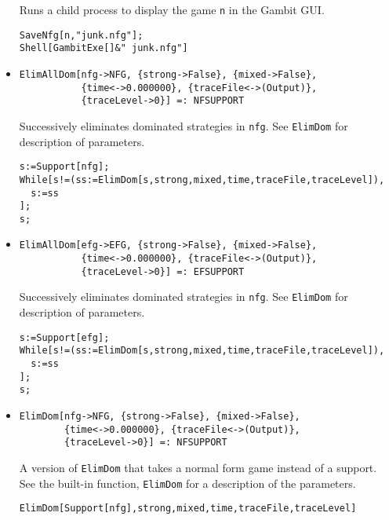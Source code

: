 \begin{itemize}
\bd 
Runs a child process to display the game \verb+n+ in the Gambit GUI. 
\begin{verbatim}
SaveNfg[n,"junk.nfg"];
Shell[GambitExe[]&" junk.nfg"]
\end{verbatim} 
\ed


\item{}
\protect \large \begin{verbatim}
ElimAllDom[nfg->NFG, {strong->False}, {mixed->False}, 
           {time<->0.000000}, {traceFile<->(Output)}, 
           {traceLevel->0}] =: NFSUPPORT 
\end{verbatim}\normalsize

\bd 
Successively eliminates dominated strategies in \verb+nfg+.  See
\verb+ElimDom+ for description of parameters.  
\begin{verbatim}
s:=Support[nfg];
While[s!=(ss:=ElimDom[s,strong,mixed,time,traceFile,traceLevel]),
  s:=ss
];
s;
\end{verbatim} 
\ed

\item{}
\protect \large \begin{verbatim}
ElimAllDom[efg->EFG, {strong->False}, {mixed->False}, 
           {time<->0.000000}, {traceFile<->(Output)}, 
           {traceLevel->0}] =: EFSUPPORT 
\end{verbatim}\normalsize

\bd 
Successively eliminates dominated strategies in \verb+nfg+. See
\verb+ElimDom+ for description of parameters.  
\begin{verbatim}
s:=Support[efg];
While[s!=(ss:=ElimDom[s,strong,mixed,time,traceFile,traceLevel]),
  s:=ss
];
s;
\end{verbatim} 
\ed

\item{}
\protect \large \begin{verbatim}
ElimDom[nfg->NFG, {strong->False}, {mixed->False}, 
        {time<->0.000000}, {traceFile<->(Output)}, 
        {traceLevel->0}] =: NFSUPPORT 
\end{verbatim}\normalsize

\bd 
A version of \verb+ElimDom+ that takes a normal form game instead
of a support.  See the built-in function, \verb+ElimDom+ for a
description of the parameters.
\begin{verbatim}
ElimDom[Support[nfg],strong,mixed,time,traceFile,traceLevel]
\end{verbatim} 
\ed


\end{itemize}
